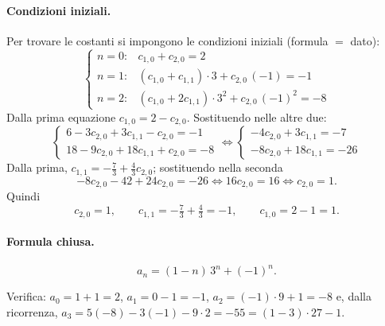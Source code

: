 \documentclass[11pt,a4paper]{article}
\begin{document}
\paragraph{Condizioni iniziali.} Per trovare le costanti si impongono le condizioni iniziali (formula $=$ dato):
\[
\begin{cases}
n = 0: & c_{1,0} + c_{2,0} = 2 \\
n = 1: & (c_{1,0} + c_{1,1})\cdot 3 + c_{2,0}\,(-1) = -1 \\
n = 2: & (c_{1,0} + 2c_{1,1})\cdot 3^2 + c_{2,0}\,(-1)^2 = -8
\end{cases}
\]
Dalla prima equazione $c_{1,0} = 2 - c_{2,0}$. Sostituendo nelle altre due:
\[
\begin{cases}
6 - 3c_{2,0} + 3c_{1,1} - c_{2,0} = -1 \\
18 - 9c_{2,0} + 18c_{1,1} + c_{2,0} = -8
\end{cases}
\iff
\begin{cases}
-4c_{2,0} + 3c_{1,1} = -7 \\
-8c_{2,0} + 18c_{1,1} = -26
\end{cases}
\]
Dalla prima, $c_{1,1} = -\tfrac{7}{3} + \tfrac{4}{3} c_{2,0}$; sostituendo nella seconda
\[
-8c_{2,0} - 42 + 24c_{2,0} = -26 \iff 16 c_{2,0} = 16 \iff c_{2,0} = 1 .
\]
Quindi
\[
c_{2,0} = 1, \qquad c_{1,1} = -\tfrac{7}{3} + \tfrac{4}{3} = -1, \qquad c_{1,0} = 2 - 1 = 1 .
\]

\paragraph{Formula chiusa.}
\[
a_n = (1 - n)\, 3^n + (-1)^n .
\]

Verifica: $a_0 = 1 + 1 = 2$, $a_1 = 0 - 1 = -1$, $a_2 = (-1)\cdot 9 + 1 = -8$ e, dalla ricorrenza, $a_3 = 5(-8) - 3(-1) - 9\cdot 2 = -55 = (1-3)\cdot 27 - 1$.
\end{document}

